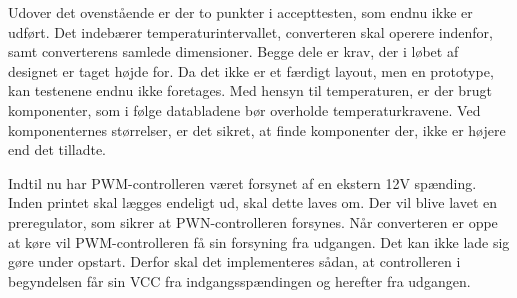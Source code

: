 Udover det ovenstående er der to punkter i accepttesten, som endnu ikke er udført. Det indebærer temperaturintervallet, converteren skal operere indenfor, samt converterens samlede dimensioner. Begge dele er krav, der i løbet af designet er taget højde for. Da det ikke er et færdigt layout, men en prototype, kan testenene endnu ikke foretages. Med hensyn til temperaturen, er der brugt komponenter, som i følge databladene bør overholde temperaturkravene. Ved komponenternes størrelser, er det sikret, at finde komponenter der, ikke er højere end det tilladte.    

Indtil nu har PWM-controlleren været forsynet af en ekstern 12V spænding. Inden printet skal lægges endeligt ud, skal dette laves om. Der vil blive lavet en preregulator, som sikrer at PWN-controlleren forsynes. Når converteren er oppe at køre vil PWM-controlleren få sin forsyning fra udgangen. Det kan ikke lade sig gøre under opstart. Derfor skal det implementeres sådan, at controlleren i begyndelsen får sin VCC fra indgangsspændingen og herefter fra udgangen. 

